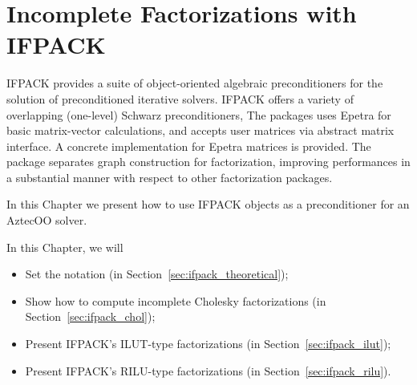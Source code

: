 % 
% 
% 
%   
%   
% 
% 

\section{Incomplete Factorizations with IFPACK}
\label{chap:ifpack}

IFPACK provides a suite of object-oriented algebraic preconditioners for
the solution of preconditioned iterative solvers. IFPACK offers a
variety of overlapping (one-level) Schwarz preconditioners, The packages
uses Epetra for basic matrix-vector calculations, and accepts user
matrices via abstract matrix interface. A concrete implementation for
Epetra matrices is provided. The package separates graph construction
for factorization, improving performances in a substantial manner with
respect to other factorization packages.

In this Chapter we present how to use IFPACK objects as a preconditioner
for an AztecOO solver. 

In this Chapter, we will
\begin{itemize}
\item Set the notation (in Section~\ref{sec:ifpack_theoretical});
\item Show how to compute incomplete Cholesky factorizations (in
  Section~\ref{sec:ifpack_chol});
\item Present IFPACK's ILUT-type factorizations (in
  Section~\ref{sec:ifpack_ilut});
\item Present IFPACK's RILU-type factorizations (in
  Section~\ref{sec:ifpack_rilu}).
\end{itemize}

